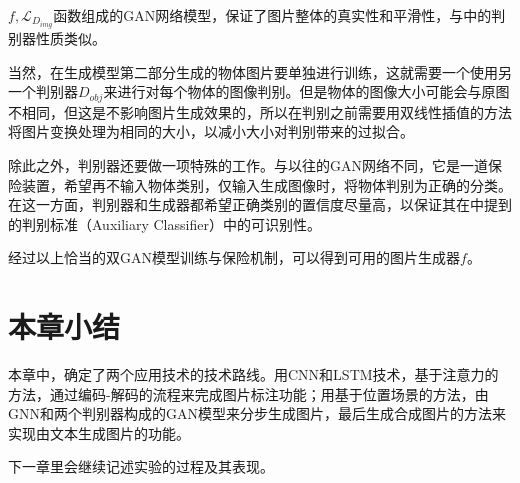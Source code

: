 $f, \mathcal{L}_{D_{img}}$函数组成的GAN网络模型，保证了图片整体的真实性和平滑性，与\cite{isola2017image}中的判别器性质类似。

当然，在生成模型第二部分生成的物体图片要单独进行训练，这就需要一个使用另一个判别器${D_{obj}}$来进行对每个物体的图像判别。但是物体的图像大小可能会与原图不相同，但这是不影响图片生成效果的，所以在判别之前需要用双线性插值的方法将图片变换处理为相同的大小，以减小大小对判别带来的过拟合。 

除此之外，判别器还要做一项特殊的工作。与以往的GAN网络不同，它是一道保险装置，希望再不输入物体类别，仅输入生成图像时，将物体判别为正确的分类。在这一方面，判别器和生成器都希望正确类别的置信度尽量高，以保证其在\cite{odena2017conditional}中提到的判别标准（Auxiliary Classifier）中的可识别性。

经过以上恰当的双GAN模型训练与保险机制，可以得到可用的图片生成器$f$。

\section{本章小结}
本章中，确定了两个应用技术的技术路线。用CNN和LSTM技术，基于注意力的方法，通过编码-解码的流程来完成图片标注功能；用基于位置场景的方法，由GNN和两个判别器构成的GAN模型来分步生成图片，最后生成合成图片的方法来实现由文本生成图片的功能。

下一章里会继续记述实验的过程及其表现。